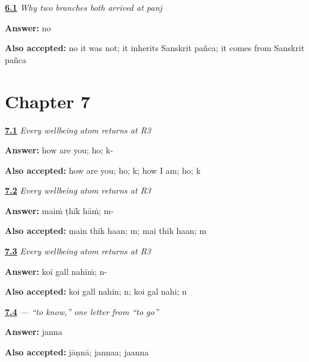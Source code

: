 \noindent\begin{minipage}[t]{\linewidth}
\raggedright
\hyperlink{review-PA-C06-panj-convergence-borrowing}{\textbf{6.1}} \emph{Why two branches both arrived at \emph{panj}}\par
\small \textbf{Answer:} no\par
\footnotesize \textbf{Also accepted:} no it was not; it inherits Sanskrit pañca; it comes from Sanskrit pañca
\end{minipage}\par\medskip

\section*{Chapter 7}

\noindent\begin{minipage}[t]{\linewidth}
\raggedright
\hyperlink{review-PA-R07-wellbeing-r3-listening}{\textbf{7.1}} \emph{Every wellbeing atom returns at R3}\par
\small \textbf{Answer:} how are you; ho; k-\par
\footnotesize \textbf{Also accepted:} how are you; ho; k; how I am; ho; k
\end{minipage}\par\medskip

\noindent\begin{minipage}[t]{\linewidth}
\raggedright
\hyperlink{review-PA-R07-wellbeing-r3-reply}{\textbf{7.2}} \emph{Every wellbeing atom returns at R3}\par
\small \textbf{Answer:} maiṁ ṭhīk hāṁ; m-\par
\footnotesize \textbf{Also accepted:} main thik haan; m; mai thik haan; m
\end{minipage}\par\medskip

\noindent\begin{minipage}[t]{\linewidth}
\raggedright
\hyperlink{review-PA-R07-wellbeing-r3-close}{\textbf{7.3}} \emph{Every wellbeing atom returns at R3}\par
\small \textbf{Answer:} koī gall nahīṁ; n-\par
\footnotesize \textbf{Also accepted:} koi gall nahin; n; koi gal nahi; n
\end{minipage}\par\medskip

\noindent\begin{minipage}[t]{\linewidth}
\raggedright
\hyperlink{review-PA-C07-janna-two-js}{\textbf{7.4}} \emph{ — “to know,” one letter from “to go”}\par
\small \textbf{Answer:} janna\par
\footnotesize \textbf{Also accepted:} jāṇnā; jannaa; jaanna
\end{minipage}\par\medskip

